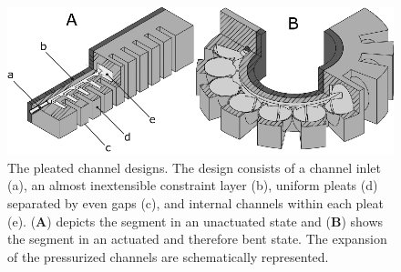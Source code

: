 
\begin{figure}[thpb]
\centering
   \includegraphics[width=0.99\columnwidth]{figures/robotic_gripper/design_gripper_detailed_bw.eps}
   \caption{The pleated channel designs. The design consists of a channel inlet (a), an almost inextensible constraint layer (b), uniform pleats (d) separated by even gaps (c), and internal channels within each pleat (e). (\textbf{A}) depicts the segment in an unactuated state and (\textbf{B}) shows the segment in an actuated and therefore bent state. The expansion of the pressurized channels are schematically represented. }
   \label{fig:design}
\end{figure}


